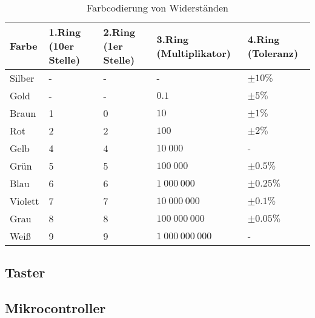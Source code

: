 \begin{table}
    \begin{adjustwidth}{-2cm}{}
        \caption{Farbcodierung von Widerständen}
        \label{tab:farbcodierung-von-widerständen}
        \begin{tabular}{| l | l | l | l | l |}
            \hline
            Farbe   & 1.Ring (10er Stelle) & 2.Ring (1er Stelle) & 3.Ring (Multiplikator) & 4.Ring (Toleranz) \\
            \hline
            Silber  & -                    & -                   & -                      & $\pm 10\%$        \\
            Gold    & -                    & -                   & $0.1$                  & $\pm 5\%$         \\
            Braun   & 1                    & 0                   & $10$                   & $\pm 1\%$         \\
            Rot     & 2                    & 2                   & $100$                  & $\pm 2\%$         \\
            Gelb    & 4                    & 4                   & $10\ 000$              & -                 \\
            Grün    & 5                    & 5                   & $100\ 000$             & $\pm 0.5\%$       \\
            Blau    & 6                    & 6                   & $1\ 000\ 000$          & $\pm 0.25\%$      \\
            Violett & 7                    & 7                   & $10\ 000\ 000$         & $\pm 0.1\%$       \\
            Grau    & 8                    & 8                   & $100\ 000\ 000$        & $\pm 0.05\%$      \\
            Weiß    & 9                    & 9                   & $1\ 000\ 000\ 000$     & -                 \\
            \hline
        \end{tabular}
    \end{adjustwidth}
\end{table}

\subsection{Taster}
\label{subsec:taster}

\subsection{Mikrocontroller \cite{arduino-r3}}
\label{subsec:mikrocontroller}

